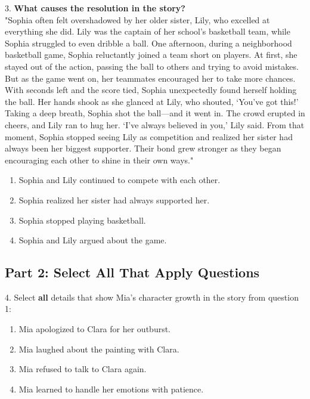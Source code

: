 \documentclass[12pt]{article}
\begin{document}
3. \textbf{What causes the resolution in the story?\\}
"Sophia often felt overshadowed by her older sister, Lily, who excelled at everything she did. Lily was the captain of her school’s basketball team, while Sophia struggled to even dribble a ball. One afternoon, during a neighborhood basketball game, Sophia reluctantly joined a team short on players. At first, she stayed out of the action, passing the ball to others and trying to avoid mistakes. But as the game went on, her teammates encouraged her to take more chances. With seconds left and the score tied, Sophia unexpectedly found herself holding the ball. Her hands shook as she glanced at Lily, who shouted, ‘You’ve got this!’ Taking a deep breath, Sophia shot the ball—and it went in. The crowd erupted in cheers, and Lily ran to hug her. ‘I’ve always believed in you,’ Lily said. From that moment, Sophia stopped seeing Lily as competition and realized her sister had always been her biggest supporter. Their bond grew stronger as they began encouraging each other to shine in their own ways."  
\begin{enumerate}[label=\Alph*.]
    \item Sophia and Lily continued to compete with each other.  
    \item Sophia realized her sister had always supported her.  
    \item Sophia stopped playing basketball.  
    \item Sophia and Lily argued about the game.  
\end{enumerate}

\vspace{1cm}

\subsection*{Part 2: Select All That Apply Questions}

4. Select \textbf{all} details that show Mia’s character growth in the story from question 1:  
\begin{enumerate}[label=\Alph*.]
    \item Mia apologized to Clara for her outburst.  
    \item Mia laughed about the painting with Clara.  
    \item Mia refused to talk to Clara again.  
    \item Mia learned to handle her emotions with patience.  
\end{enumerate}
\end{document}
